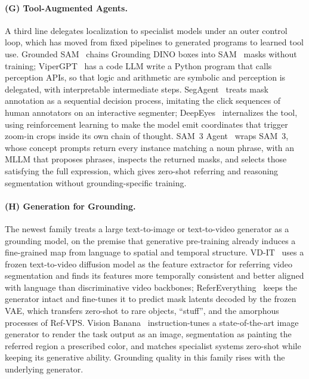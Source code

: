 \paragraph{(G) Tool-Augmented Agents.}
A third line delegates localization to specialist models under an outer control loop, which has moved from fixed pipelines to generated programs to learned tool use. Grounded SAM~\cite{ren2024grounded} chains Grounding DINO boxes into SAM~\cite{kirillov2023sam} masks without training; ViperGPT~\cite{suris2023vipergpt} has a code LLM write a Python program that calls perception APIs, so that logic and arithmetic are symbolic and perception is delegated, with interpretable intermediate steps. SegAgent~\cite{zhu2025segagent} treats mask annotation as a sequential decision process, imitating the click sequences of human annotators on an interactive segmenter; DeepEyes~\cite{zheng2025deepeyes} internalizes the tool, using reinforcement learning to make the model emit coordinates that trigger zoom-in crops inside its own chain of thought. SAM~3 Agent~\cite{carion2025sam} wraps SAM~3, whose concept prompts return every instance matching a noun phrase, with an MLLM that proposes phrases, inspects the returned masks, and selects those satisfying the full expression, which gives zero-shot referring and reasoning segmentation without grounding-specific training.

\paragraph{(H) Generation for Grounding.}
The newest family treats a large text-to-image or text-to-video generator as a grounding model, on the premise that generative pre-training already induces a fine-grained map from language to spatial and temporal structure. VD-IT~\cite{zhu2024exploring} uses a frozen text-to-video diffusion model as the feature extractor for referring video segmentation and finds its features more temporally consistent and better aligned with language than discriminative video backbones; ReferEverything~\cite{bagchi2025refereverything} keeps the generator intact and fine-tunes it to predict mask latents decoded by the frozen VAE, which transfers zero-shot to rare objects, ``stuff'', and the amorphous processes of Ref-VPS. Vision Banana~\cite{gabeur2026image} instruction-tunes a state-of-the-art image generator to render the task output as an image, segmentation as painting the referred region a prescribed color, and matches specialist systems zero-shot while keeping its generative ability. Grounding quality in this family rises with the underlying generator.

